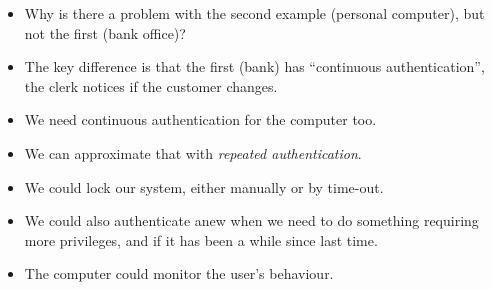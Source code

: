 \begin{frame}
  \begin{exercise}
    \begin{itemize}
      \item Why is there a problem with the second example (personal computer), 
        but not the first (bank office)?
    \end{itemize}
  \end{exercise}
\end{frame}

\begin{frame}
  \begin{remark}
    \begin{itemize}
      \item The key difference is that the first (bank) has \enquote{continuous 
          authentication}, the clerk notices if the customer changes.

      \item We need continuous authentication for the computer too.
    \end{itemize}
  \end{remark}

  \pause

  \begin{solution}
    \begin{itemize}
      \item We can approximate that with \emph{repeated authentication}.

      \item We could lock our system, either manually or by time-out.

      \item We could also authenticate anew when we need to do something 
        requiring more privileges, and if it has been a while since last time.

      \item The computer could monitor the user's behaviour.
    \end{itemize}
  \end{solution}
\end{frame}




\begin{frame}[allowframebreaks]
	\small
  \printbibliography{}
\end{frame}

